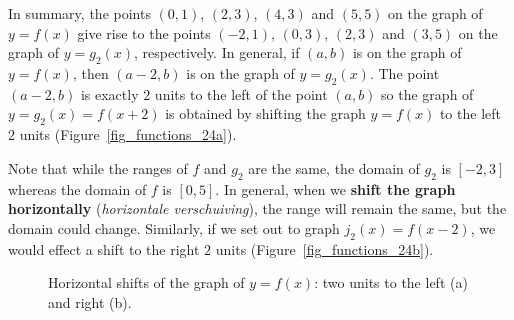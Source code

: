 In summary, the points $(0,1)$, $(2,3)$, $(4,3)$ and $(5,5)$ on the graph of $y=f(x)$ give rise to the points  $(-2,1)$, $(0,3)$, $(2,3)$ and $(3,5)$ on the graph of $y=g_2(x)$, respectively.  In general, if $(a,b)$ is on the graph of $y=f(x)$, then $(a-2,b)$ is on the graph of $y=g_2(x)$. The point $(a-2,b)$ is exactly $2$ units to the left of the point $(a,b)$ so the graph of $y=g_2(x)=f(x+2)$ is obtained by shifting the graph $y=f(x)$ to the left $2$ units (Figure~\ref{fig_functions_24a}).

Note that while the ranges of $f$ and $g_2$ are the same, the domain of $g_2$ is $[-2,3]$ whereas the domain of $f$ is $[0,5]$.  In general, when we \textbf{shift the graph horizontally} (\textit{horizontale verschuiving}), the range will remain the same, but the domain could change.  Similarly, if we set out to graph $j_2(x) = f(x-2)$, we would  effect a shift to the right $2$ units (Figure~\ref{fig_functions_24b}).

\begin{figure}[H]
\centering
\centerline{
\hspace{0.1cm}
}
\caption{Horizontal shifts of the graph of $y=f(x)$: two units to the left (a) and right (b). }
\end{figure}


